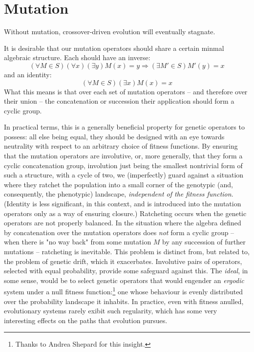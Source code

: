\documentclass[11pt]{article}
\begin{document}
\section{Mutation}
\label{sec:org0262598}

Without mutation, crossover-driven evolution will eventually stagnate. 

It is desirable that our mutation operators should share a certain minmal
algebraic structure. Each should have an inverse:
\[
(\forall M\in S)(\forall x)(\exists y) M(x) = y \Rightarrow 
(\exists M'\in S) M'(y) = x
\]
and an identity:
\[
(\forall M\in S)(\exists x) M(x) = x
\]
What this means is that over each set of mutation operators -- and
therefore over their union -- the concatenation or succession their
application should form a cyclic group.

In practical terms, this is a generally beneficial property for genetic
operators to possess: all else being equal, they should be designed with
an eye towards neutrality with respect to an arbitrary choice of fitness
functions. By ensuring that the mutation operators are involutive, or, more
generally, that they form a cyclic concatenation group, involution just being
the smallest nontrivial form of such a structure, with a cycle of two, we
(imperfectly) guard against a situation where they ratchet the population into a
small corner of the genotypic (and, consequently, the phenotypic) landscape,
\emph{independent of the fitness function}. (Identity is less significant, in this
context, and is introduced into the mutation operators only
as a way of ensuring closure.) Ratcheting occurs when the genetic
operators are not properly balanced. In the situation where the algebra defined
by concatenation over the mutation operators does \emph{not} form a cyclic group --
when there is "no way back" from some mutation \(M\) by any succession of further
mutations -- ratcheting is inevitable. This problem is distinct from, but
related to, the problem of genetic drift, which it exacerbates. Involutive pairs
of operators, selected with equal probability, provide some safeguard against
this. The \emph{ideal}, in some sense, would be to select genetic operators that
would engender an \emph{ergodic} system under a null fitness function:\footnote{Thanks to
 Andrea Shepard for this insight.} one whose behaviour is evenly distributed
over the probability landscape it inhabits. In practice, even with fitness
anulled, evolutionary systems rarely exibit such regularity, which has some very
interesting effects on the paths that evolution pursues.
\end{document}
